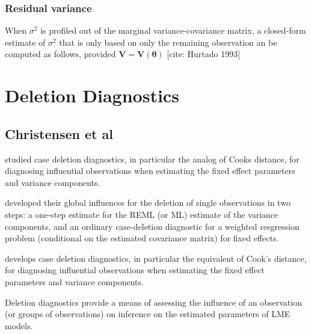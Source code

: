 \documentclass[12pt, a4paper]{report}
\theoremstyle{plain}
\theoremstyle{definition}
\theoremstyle{remark}
\begin{document}
	
	
	
	
	

	\subsubsection{Residual variance}
	When $\sigma^2$ is profiled out of the marginal variance-covariance matrix, a closed-form estimate of $\sigma^2$ that is only based on only the remaining observation
	an be computed as follows, provided $\boldsymbol{V} = \boldsymbol{V}(\boldsymbol{\theta}) $
	[cite: Hurtado 1993]
	

	\section{Deletion Diagnostics}
	
	\subsection{Christensen et al}         %
	\citet{Christensen} studied case deletion diagnostics, in particular the analog of Cooks
	distance, for diagnosing influential observations when estimating
	the fixed effect parameters and variance
	components.
	
	
	\citet{Christensen} developed their global influences for the deletion of single observations in two steps: a one-step estimate for the REML (or ML) estimate of the variance components, and an ordinary case-deletion diagnostic for a weighted resgression problem (conditional on the estimated covariance matrix) for fixed effects.
	
	\citet{Christensen} develops  case deletion diagnostics, in particular the equivalent of  Cook's distance, for diagnosing influential observations when estimating the fixed effect parameters and variance components.
	
	Deletion diagnostics provide a means of assessing the influence of an observation (or groups of observations) on inference on the estimated parameters of LME models. 
	
\end{document}

